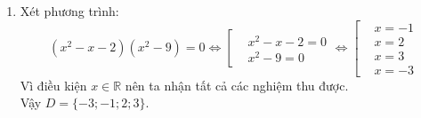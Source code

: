 \begin{ex}
{\begin{enumerate}
			\item[d)] Xét phương trình:
			$$ (x^2 - x - 2)(x^2 - 9) = 0 \Leftrightarrow \left[ \begin{aligned} &x^2 - x - 2 = 0 \\ &x^2 - 9 = 0 \end{aligned} \right. \Leftrightarrow \left[ \begin{aligned} &x = -1 \\ &x = 2 \\ &x = 3 \\ &x = -3 \end{aligned} \right. $$
			Vì điều kiện $x \in \mathbb{R}$ nên ta nhận tất cả các nghiệm thu được.\\
			Vậy $D = \{-3; -1; 2; 3\}$.
		\end{enumerate}
	}
\end{ex}
